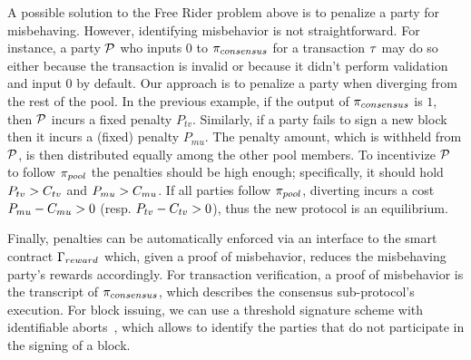 A possible solution to the Free Rider problem above is to penalize a party
for misbehaving.  However, identifying misbehavior is not straightforward. For
instance, a party $\mathcal{P}$ who inputs $0$ to $\pi_{consensus}$ for a transaction
$\tau$ may do so either because the transaction is invalid or because it
didn't perform validation and input $0$ by default. Our approach is to
penalize a party when diverging from the rest of the pool. In the previous
example, if the output of $\pi_{consensus}$ is $1$, then $\mathcal{P}$ incurs a fixed
penalty $P_{tv}$. Similarly, if a party fails to sign a new block
then it incurs a (fixed) penalty $P_{mu}$. The penalty amount,
which is withheld from $\mathcal{P}$, is then distributed equally among the other
pool members.  To incentivize $\mathcal{P}$ to follow $\pi_{pool}$ the penalties should
be high enough; specifically, it should hold $P_{tv} >
C_{tv}$ and $P_{mu} > C_{mu}$.  If all parties follow
$\pi_{pool}$, diverting incurs a cost $P_{mu} - C_{mu} > 0$
(resp. $P_{tv} - C_{tv} > 0$), thus the new protocol is an
equilibrium.

Finally, penalties can be automatically enforced via an interface to the smart
contract $\Gamma_{reward}$ which, given a proof of misbehavior, reduces the
misbehaving party's rewards accordingly. For transaction verification, a proof
of misbehavior is the transcript of $\pi_{consensus}$, which describes the
consensus sub-protocol's execution. For block issuing, we can use a threshold
signature scheme with identifiable aborts~\cite{EPRINT:GenGol20,CCS:CGGMP20},
which allows to identify the parties that do not participate in the signing of
a block.
